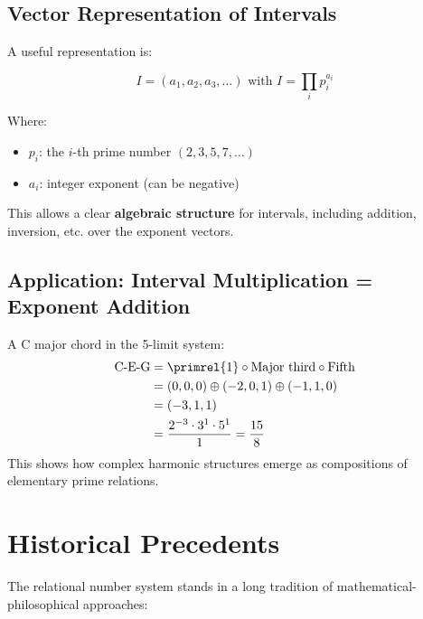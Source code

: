 	\subsection{Vector Representation of Intervals}
	
	A useful representation is:
	
	\begin{definition}
		\begin{equation}
			I = (a_1, a_2, a_3, \ldots) \text{ with } I = \prod_{i} p_i^{a_i}
		\end{equation}
		
		Where:
		\begin{itemize}
			\item $p_i$: the $i$-th prime number $(2, 3, 5, 7, \ldots)$
			\item $a_i$: integer exponent (can be negative)
		\end{itemize}
	\end{definition}
	
	This allows a clear \textbf{algebraic structure} for intervals, including addition, inversion, etc. over the exponent vectors.
	
	\subsection{Application: Interval Multiplication = Exponent Addition}
	
	\begin{example}
		A C major chord in the 5-limit system:
		\begin{align}
			\text{C-E-G} &= \primrel{1} \circ \text{Major third} \circ \text{Fifth} \\
			&= (0,0,0) \oplus (-2,0,1) \oplus (-1,1,0) \\
			&= (-3,1,1) \\
			&= \frac{2^{-3} \cdot 3^1 \cdot 5^1}{1} = \frac{15}{8}
		\end{align}
		This shows how complex harmonic structures emerge as compositions of elementary prime relations.
	\end{example}
	
	\section{Historical Precedents}
	
	The relational number system stands in a long tradition of mathematical-philosophical approaches:
	
